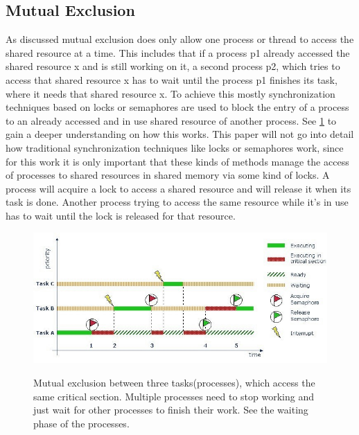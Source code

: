 \subsection{Mutual Exclusion}\label{subsec:mutual-exclusion}

As discussed mutual exclusion does only allow one process or thread to access the shared resource at a time. This includes that if a process p1 already accessed the shared resource x and is still working on it, a second process p2, which tries to access that shared resource x has to wait until the process p1 finishes its task, where it needs that shared resource x. To achieve this mostly synchronization techniques based on locks or semaphores are used to block the entry of a process to an already accessed and in use shared resource of another process. See \cref{fig:mutual-exclusion} to gain a deeper understanding on how this works. This paper will not go into detail how traditional synchronization techniques like locks or semaphores work, since for this work it is only important that these kinds of methods manage the access of processes to shared resources in shared memory via some kind of locks. A process will acquire a lock to access a shared resource and will release it when its task is done. Another process trying to access the same resource while it's in use has to wait until the lock is released for that resource.

\begin{figure}[!ht]
    \centering
    \captionsetup{justification=centering}
    \caption{Mutual exclusion between three tasks(processes), which access the same critical section. Multiple processes need to stop working and just wait for other processes to finish their work. See the waiting phase of the processes.}
    \includegraphics[width=135mm]{images/mutual_exclusion.jpg}
    \cite{MutualExclusion}
    \label{fig:mutual-exclusion}
\end{figure}

